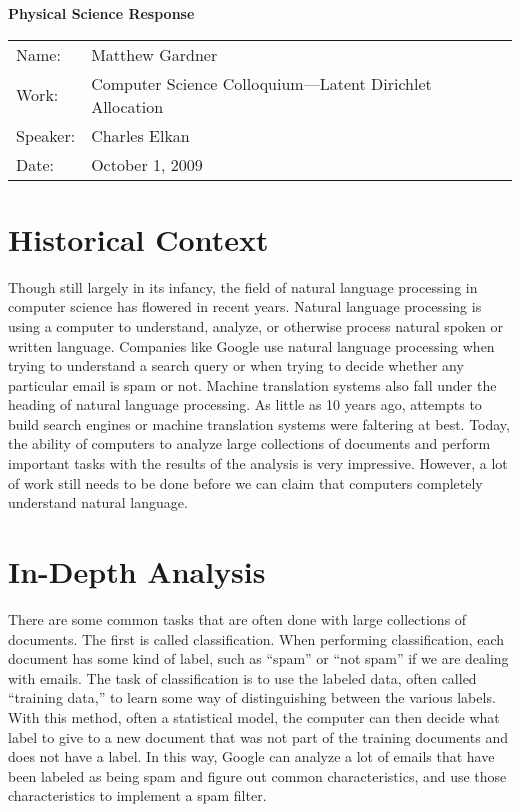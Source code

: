 \documentclass[onecolumn, 12pt]{article}
\title{}
\author{Matthew Gardner}
\date{}
\begin{document}
\textbf{Physical Science Response}

\begin{tabular}{ll}
  Name:&Matthew Gardner \\
  Work:&Computer Science Colloquium---Latent Dirichlet Allocation \\
  Speaker:&Charles Elkan \\
  Date:&October 1, 2009 \\
\end{tabular}

\section*{Historical Context}

Though still largely in its infancy, the field of natural language processing
in computer science has flowered in recent years.  Natural language processing
is using a computer to understand, analyze, or otherwise process natural spoken
or written language.  Companies like Google use natural language processing
when trying to understand a search query or when trying to decide whether any
particular email is spam or not.  Machine translation systems also fall under
the heading of natural language processing.  As little as 10 years ago,
attempts to build search engines or machine translation systems were faltering
at best.  Today, the ability of computers to analyze large collections of
documents and perform important tasks with the results of the analysis is very
impressive.  However, a lot of work still needs to be done before we can claim
that computers completely understand natural language.

\section*{In-Depth Analysis}

There are some common tasks that are often done with large collections of
documents.  The first is called classification.  When performing
classification, each document has some kind of label, such as ``spam'' or ``not
spam'' if we are dealing with emails.  The task of classification is to use the
labeled data, often called ``training data,'' to learn some way of
distinguishing between the various labels.  With this method, often a
statistical model, the computer can then decide what label to give to a new
document that was not part of the training documents and does not have a label.
In this way, Google can analyze a lot of emails that have been labeled as being
spam and figure out common characteristics, and use those characteristics to
implement a spam filter.
\end{document}
